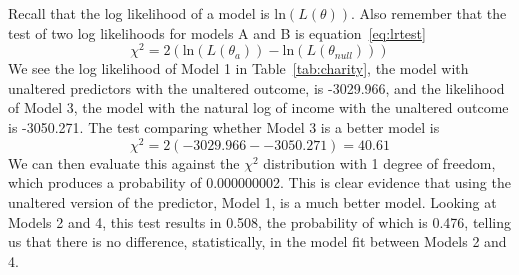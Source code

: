 Recall that the log likelihood of a model is $\mbox{ln}\left(L\left(\theta\right)\right)$. Also remember that the test of two log likelihoods for models A and B is equation~\eqref{eq:lrtest}
\[
\chi^2=2\left(\mbox{ln}\left(L\left(\theta_a\right)\right)-\mbox{ln}\left(L\left(\theta_{null}\right)\right)\right)
\]
We see the log likelihood of Model 1 in Table~\ref{tab:charity}, the model with unaltered predictors with the unaltered outcome, is -3029.966, and the likelihood of Model 3, the model with the natural log of income with the unaltered outcome is -3050.271. The test comparing whether Model 3 is a better model is
\[
\chi^2=2\left(-3029.966- -3050.271\right)=40.61
\]
We can then evaluate this against the $\chi^2$ distribution with 1 degree of freedom, which produces a probability of 0.000000002. This is clear evidence that using the unaltered version of the predictor, Model 1, is a much better model. Looking at Models 2 and 4, this test results in 0.508, the probability of which is 0.476, telling us that there is no difference, statistically, in the model fit between Models 2 and 4. 